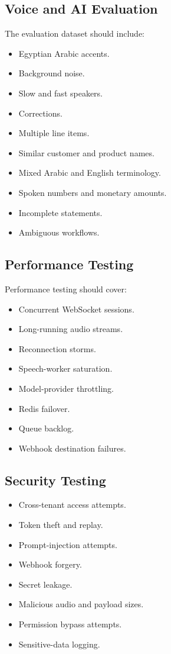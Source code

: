 \documentclass[11pt,a4paper]{article}
\begin{document}
\subsection{Voice and AI Evaluation}

The evaluation dataset should include:

\begin{itemize}
\item Egyptian Arabic accents.
\item Background noise.
\item Slow and fast speakers.
\item Corrections.
\item Multiple line items.
\item Similar customer and product names.
\item Mixed Arabic and English terminology.
\item Spoken numbers and monetary amounts.
\item Incomplete statements.
\item Ambiguous workflows.
\end{itemize}

\subsection{Performance Testing}

Performance testing should cover:

\begin{itemize}
\item Concurrent WebSocket sessions.
\item Long-running audio streams.
\item Reconnection storms.
\item Speech-worker saturation.
\item Model-provider throttling.
\item Redis failover.
\item Queue backlog.
\item Webhook destination failures.
\end{itemize}

\subsection{Security Testing}

\begin{itemize}
\item Cross-tenant access attempts.
\item Token theft and replay.
\item Prompt-injection attempts.
\item Webhook forgery.
\item Secret leakage.
\item Malicious audio and payload sizes.
\item Permission bypass attempts.
\item Sensitive-data logging.
\end{itemize}
\end{document}
